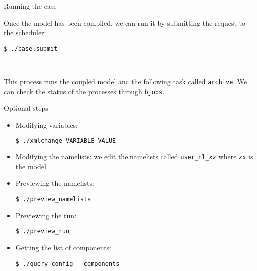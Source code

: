 
\begin{frame}[fragile]{Running the case}

Once the model has been compiled, we can run it by submitting the request to the scheduler:

\begin{verbatim}
$ ./case.submit
\end{verbatim}

\ 

This process runs the coupled model and the following task called \texttt{archive}. We can check the status of the processes through \texttt{bjobs}.

\end{frame}




\begin{frame}[fragile]{Optional steps}

\begin{itemize}
    \item<1-> Modifying variables:
    \begin{verbatim}
$ ./xmlchange VARIABLE VALUE
    \end{verbatim}
    
    \item<2-> Modifying the namelists: we edit the namelists called \texttt{user\_nl\_\textit{xx}} where \texttt{\textit{xx}} is the model
    
    \item<3-> Previewing the namelists: 
    \begin{verbatim}
$ ./preview_namelists
    \end{verbatim}
    
    \item<4-> Previewing the run:
    \begin{verbatim}
$ ./preview_run
    \end{verbatim}

    \item<5-> Getting the list of components:
    \begin{verbatim}
$ ./query_config --components 
    \end{verbatim}

\end{itemize}
\end{frame}

